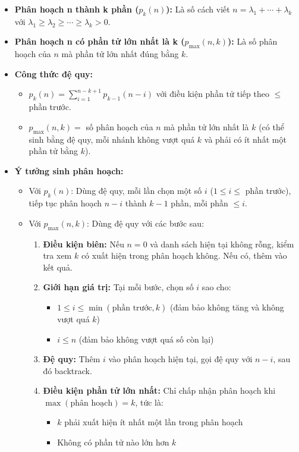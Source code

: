 \documentclass{article}
\begin{document}
\begin{itemize}
    \item \textbf{Phân hoạch n thành k phần ($p_k(n)$):} Là số cách viết $n = \lambda_1 + \cdots + \lambda_k$ với $\lambda_1 \geq \lambda_2 \geq \cdots \geq \lambda_k > 0$.
    \item \textbf{Phân hoạch n có phần tử lớn nhất là k ($p_{\max}(n, k)$):} Là số phân hoạch của $n$ mà phần tử lớn nhất đúng bằng $k$.
    \item \textbf{Công thức đệ quy:}
    \begin{itemize}
        \item $p_k(n) = \sum\limits_{i=1}^{n-k+1} p_{k-1}(n-i)$ với điều kiện phần tử tiếp theo $\leq$ phần trước.
        \item $p_{\max}(n, k) = $ số phân hoạch của $n$ mà phần tử lớn nhất là $k$ (có thể sinh bằng đệ quy, mỗi nhánh không vượt quá $k$ và phải có ít nhất một phần tử bằng $k$).
    \end{itemize}
    \item \textbf{Ý tưởng sinh phân hoạch:}
    \begin{itemize}
        \item Với $p_k(n)$: Dùng đệ quy, mỗi lần chọn một số $i$ ($1 \leq i \leq$ phần trước), tiếp tục phân hoạch $n-i$ thành $k-1$ phần, mỗi phần $\leq i$.
        \item Với $p_{\max}(n, k)$: Dùng đệ quy với các bước sau:
        \begin{enumerate}
            \item \textbf{Điều kiện biên:} Nếu $n = 0$ và danh sách hiện tại không rỗng, kiểm tra xem $k$ có xuất hiện trong phân hoạch không. Nếu có, thêm vào kết quả.
            
            \item \textbf{Giới hạn giá trị:} Tại mỗi bước, chọn số $i$ sao cho:
            \begin{itemize}
                \item $1 \leq i \leq \min(\text{phần trước}, k)$ (đảm bảo không tăng và không vượt quá $k$)
                \item $i \leq n$ (đảm bảo không vượt quá số còn lại)
            \end{itemize}
            
            \item \textbf{Đệ quy:} Thêm $i$ vào phân hoạch hiện tại, gọi đệ quy với $n-i$, sau đó backtrack.
            
            \item \textbf{Điều kiện phần tử lớn nhất:} Chỉ chấp nhận phân hoạch khi $\max(\text{phân hoạch}) = k$, tức là:
            \begin{itemize}
                \item $k$ phải xuất hiện ít nhất một lần trong phân hoạch
                \item Không có phần tử nào lớn hơn $k$
            \end{itemize}
        \end{enumerate}
    \end{itemize}
\end{itemize}
\end{document}
